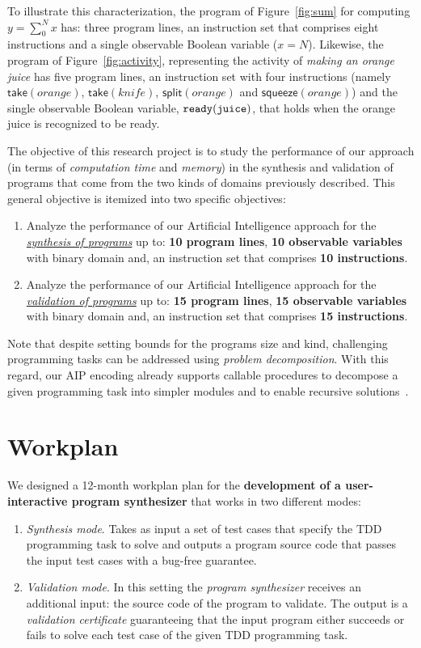 \documentclass[10pt,a4paper]{paper}
\begin{document}
To illustrate this characterization, the program of Figure~\ref{fig:sum} for computing $y = \sum_0^N x$ has: three program lines, an instruction set that comprises eight instructions and a single observable Boolean variable ($x=N$). Likewise, the program of Figure~\ref{fig:activity}, representing the activity of {\em making an orange juice} has five program lines, an instruction set with four instructions (namely $\mathsf{take}(orange)$, $\mathsf{take}(knife)$, $\mathsf{split}(orange)$ and $\mathsf{squeeze}(orange)$) and the single observable Boolean variable, ${\tt ready(juice)}$, that holds when the orange juice is recognized to be ready.

The objective of this research project is to study the performance of our approach (in terms of  {\em computation time} and {\em memory}) in the synthesis and validation of programs that come from the two kinds of domains previously described. This general objective is itemized into two specific objectives:
\begin{enumerate}
\item Analyze the performance of our Artificial Intelligence approach for the \underline{\em synthesis of programs} up to: {\bf 10 program lines}, {\bf 10 observable variables} with binary domain and, an instruction set that comprises {\bf 10 instructions}. 
\item Analyze the performance of our Artificial Intelligence approach for the \underline{\em validation of programs} up to: {\bf 15 program lines}, {\bf 15 observable variables} with binary domain and, an instruction set that comprises {\bf 15 instructions}. 
\end{enumerate}

Note that despite setting bounds for the programs size and kind, challenging programming tasks can be addressed using {\em problem decomposition}. With this regard, our AIP encoding already supports callable procedures to decompose a given programming task into simpler modules and to enable recursive solutions~\cite{sergio:aprograming:icaps16,sergio:aprograming:ijcai16,jimenez2018review,segovia:FSC:JAIR2018,segovia:programs:AIJ19}.
\newpage

\section{Workplan}
\label{sec:workplan}

We designed a 12-month workplan plan for the {\bf development of a user-interactive program synthesizer} that works in two different modes:
\begin{enumerate}
\item {\em Synthesis mode}. Takes as input a set of test cases that specify the TDD programming task to solve and outputs a program source code that passes the input test cases with a bug-free guarantee.
\item {\em Validation mode}. In this setting the {\em program synthesizer} receives an additional input: the source code of the program to validate. The output is a {\em validation certificate} guaranteeing that the input program either succeeds or fails to solve each test case of the given TDD programming task. 
\end{enumerate}
\end{document}

